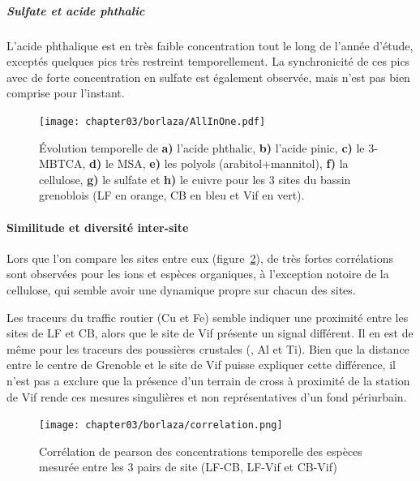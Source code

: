 \subparagraph{Sulfate et acide phthalic}%
\label{par:sulfate_et_acide_phthalic}

L'acide phthalique est en très faible concentration tout le long de l'année d'étude,
exceptés quelques pics très restreint temporellement. La synchronicité de ces pics avec de
forte concentration en sulfate est également observée, mais n'est pas bien comprise pour
l'instant.


\begin{figure}[ht]
    \centering
    \texttt{[image: chapter03/borlaza/AllInOne.pdf]}
    \caption{
        Évolution temporelle de \textbf{a)} l'acide phthalic, \textbf{b)} l'acide pinic,
        \textbf{c)} le 3-MBTCA, \textbf{d)} le MSA, \textbf{e)} les polyols
        (arabitol+mannitol), \textbf{f)} la cellulose, \textbf{g)} le sulfate et
        \textbf{h)} le cuivre pour les 3 sites du bassin grenoblois (LF en orange, CB en
        bleu et Vif en vert).
    }%
    \label{fig:borlaza_evolution_temporelle}
\end{figure}

\paragraph{Similitude et diversité inter-site}%
\label{par:similitude_et_diversité_inter_site}

Lors que l'on compare les sites entre eux
(figure~\ref{fig:chapter03/borlaza/correlation}), de très fortes corrélations sont
observées pour les ions et espèces organiques, à l'exception notoire de la cellulose, qui
semble avoir une dynamique propre sur chacun des sites.

Les traceurs du traffic routier (Cu et Fe) semble indiquer une proximité entre les sites de
LF et CB, alors que le site de Vif présente un signal différent. Il en est de même pour
les traceurs des poussières crustales (, Al et Ti). Bien que la distance entre
le centre de Grenoble et le site de Vif puisse expliquer cette différence, il n'est pas a
exclure que la présence d'un terrain de cross à proximité de la station de Vif rende ces
mesures singulières et non représentatives d'un fond périurbain.

\begin{figure}[ht]
    \centering
    \texttt{[image: chapter03/borlaza/correlation.png]}
    \caption{Corrélation de pearson des concentrations temporelle des espèces mesurée
    entre les 3 pairs de site (LF-CB, LF-Vif et CB-Vif)}%
    \label{fig:chapter03/borlaza/correlation}
\end{figure}

